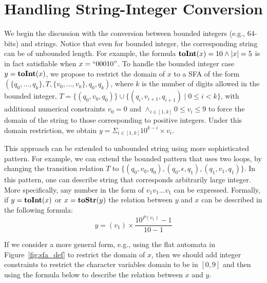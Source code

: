 \documentclass{llncs}
\begin{document}





\section{Handling String-Integer Conversion} \label{section:s2i}
We begin the discussion with the conversion between bounded integers (e.g., 64-bits) and strings. Notice that even for bounded integer, the corresponding string can be of unbounded length. For example, the formula $\mbox{\textbf{toInt}($x$)}=10 \wedge |x|=5$ is in fact satisfiable when $x=``00010"$. To handle the bounded integer case $y=\mbox{\textbf{toInt}($x$)}$, we propose to restrict the domain of $x$ to a SFA of the form $(\{q_0,\ldots,q_k\},T,\{v_0,\ldots,v_k\}, q_0,q_k)$, where $k$ is the number of digits allowed in the bounded integer, $T = \{(q_0,v_0,q_0)\} \cup \{(q_i,v_{i+1},q_{i+1})\mid 0\leq i <k\}$, with additional numerical constraints $v_0=0$ and $\wedge_{i\in [1,k]} 0 \leq v_i \leq 9$ to force the domain of the string to those corresponding to positive integers. Under this domain restriction, we obtain $y=\Sigma_{i\in [1,k]} 10^{k-i}\times v_i$. 



This approach can be extended to unbounded string using more sophisticated pattern. For example, we can extend the bounded pattern that uses two loops, by changing the transition relation $T$ to $\{(q_0,v_0,q_0), (q_0,\epsilon,q_1), (q_1,v_1,q_1)\}$. In this pattern, one can describe string that corresponds arbitrarily large integer. More specifically, any number in the form of $v_1v_1\ldots v_1$ can be expressed. Formally, if $y=\mbox{\textbf{toInt}($x$)}$ or $x=\mbox{\textbf{toStr}($y$)}$ the relation between $y$ and $x$ can be described in the following formula:
$$y= (v_1)\times \frac{10^{P(v_1)}-1}{10-1}$$

If we consider a more general form, e.g., using the flat automata in Figure~\ref{fig:sfa_def} to restrict the domain of $x$, then we should add integer constraints to restrict the character variables domain to be in $[0,9]$ and then using the formula below to describe the relation between $x$ and $y$.
\end{document}
